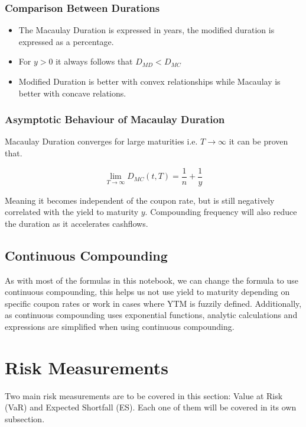 \documentclass[10pt,letterpaper]{article}
\begin{document}
\subsubsection{Comparison Between Durations}
\begin{itemize}
\item The Macaulay Duration is expressed in years, the modified duration is expressed as a percentage.
\item For $y>0$	it always follows that $D_{MD} < D_{MC}$
\item Modified Duration is better with convex relationships while Macaulay is better with concave relations.
\end{itemize}

\subsubsection{Asymptotic Behaviour of Macaulay Duration}
Macaulay Duration converges for large maturities i.e. $T\to\infty$ it can be proven that.

\begin{equation}\label{macaulaylim}
\lim_{T\to\infty} D_{MC}(t, T) = \frac{1}{n} + \frac{1}{y}
\end{equation}

Meaning it becomes independent of the coupon rate, but is still negatively correlated with the yield to maturity $y$. Compounding frequency will also reduce the duration as it accelerates cashflows.

\subsection{Continuous Compounding}

As with most of the formulas in this notebook, we can change the formula to use continuous compounding, this helps us not use yield to maturity depending on specific coupon rates or work in cases where YTM is fuzzily defined. Additionally, as continuous compounding uses exponential functions, analytic calculations and expressions are simplified when using continuous compounding.


\section{Risk Measurements}
Two main risk measurements are to be covered in this section: Value at Risk (VaR) and Expected Shortfall (ES). Each one of them will be covered in its own subsection.
\end{document}
